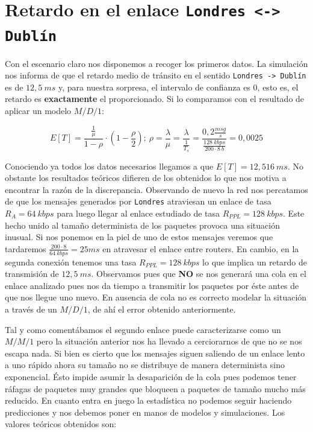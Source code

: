 \documentclass{article}[10pt]
\begin{document}
	\section{Retardo en el enlace \texttt{Londres <-> Dublín}}
		Con el escenario claro nos disponemos a recoger los primeros datos. La simulación nos informa de que el retardo medio de tránsito en el sentido \texttt{Londres -> Dublín} es de $12,5\ ms$ y, para nuestra sorpresa, el intervalo de confianza es $0$, esto es, el retardo es \textbf{exactamente} el proporcionado. Si lo comparamos con el resultado de aplicar un modelo $M/D/1$:

		$$E[T] = \frac{\frac{1}{\mu}}{1 - \rho} \cdot (1 - \frac{\rho}{2});\ \rho = \frac{\lambda}{\mu} = \frac{\lambda}{\frac{1}{T_s}} = \frac{0,2 \frac{msg}{s}}{\frac{128\ kbps}{200 \cdot 8\ b}} = 0,0025$$

		Conociendo ya todos los datos necesarios llegamos a que $E[T] = 12,516\ ms$. No obstante los resultados teóricos difieren de los obtenidos lo que nos motiva a encontrar la razón de la discrepancia. Observando de nuevo la red nos percatamos de que los mensajes generados por \texttt{Londres} atraviesan un enlace de tasa $R_A = 64\ kbps$ para luego llegar al enlace estudiado de tasa $R_{PPL} = 128\ kbps$. Este hecho unido al tamaño determinista de los paquetes provoca una situación inusual. Si nos ponemos en la piel de uno de estos mensajes veremos que tardaremos $\frac{200 \cdot 8}{64\ kbps} = 25 ms$ en atravesar el enlace entre routers. En cambio, en la segunda conexión tenemos una tasa $R_{PPL} = 128\ kbps$ lo que implica un retardo de transmisión de $12,5\ ms$. Observamos pues que \textbf{NO} se nos generará una cola en el enlace analizado pues nos da tiempo a transmitir los paquetes por éste antes de que nos llegue uno nuevo. En ausencia de cola no es correcto modelar la situación a través de un $M/D/1$, de ahí el error obtenido anteriormente.

		Tal y como comentábamos el segundo enlace puede caracterizarse como un $M/M/1$ pero la situación anterior nos ha llevado a cerciorarnos de que no se nos escapa nada. Si bien es cierto que los mensajes siguen saliendo de un enlace lento a uno rápido ahora su tamaño no se distribuye de manera determinista sino exponencial. Ésto impide asumir la desaparición de la cola pues podemos tener ráfagas de paquetes muy grandes que bloqueen a paquetes de tamaño mucho más reducido. En cuanto entra en juego la estadística no podemos seguir haciendo predicciones y nos debemos poner en manos de modelos y simulaciones. Los valores teóricos obtenidos son:
\end{document}
